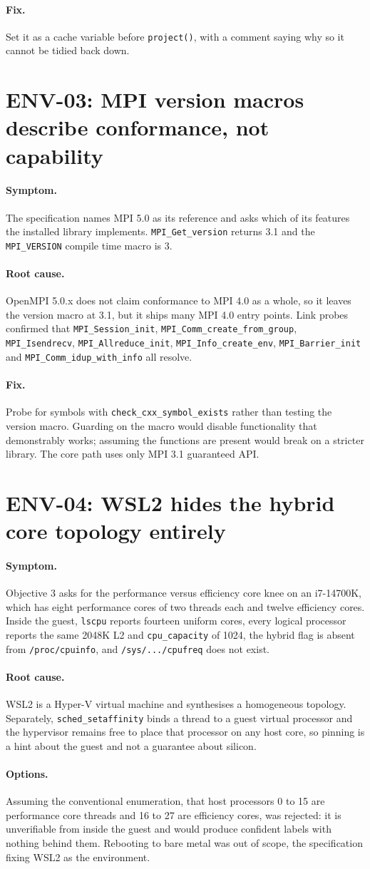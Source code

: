 \documentclass[11pt,a4paper]{report}
\newcommand{\symptom}[1]{\paragraph{Symptom.}#1}
\newcommand{\rootcause}[1]{\paragraph{Root cause.}#1}
\newcommand{\options}[1]{\paragraph{Options.}#1}
\newcommand{\fix}[1]{\paragraph{Fix.}#1}
\begin{document}
\fix{Set it as a cache variable before \texttt{project()}, with a comment saying
why so it cannot be tidied back down.}

\section{ENV-03: MPI version macros describe conformance, not capability}

\symptom{The specification names MPI 5.0 as its reference and asks which of its
features the installed library implements. \texttt{MPI\_Get\_version} returns
3.1 and the \texttt{MPI\_VERSION} compile time macro is 3.}

\rootcause{OpenMPI 5.0.x does not claim conformance to MPI 4.0 as a whole, so it
leaves the version macro at 3.1, but it ships many MPI 4.0 entry points. Link
probes confirmed that \texttt{MPI\_Session\_init},
\texttt{MPI\_Comm\_create\_from\_group}, \texttt{MPI\_Isendrecv},
\texttt{MPI\_Allreduce\_init}, \texttt{MPI\_Info\_create\_env},
\texttt{MPI\_Barrier\_init} and \texttt{MPI\_Comm\_idup\_with\_info} all
resolve.}

\fix{Probe for symbols with \texttt{check\_cxx\_symbol\_exists} rather than
testing the version macro. Guarding on the macro would disable functionality
that demonstrably works; assuming the functions are present would break on a
stricter library. The core path uses only MPI 3.1 guaranteed API.}

\section{ENV-04: WSL2 hides the hybrid core topology entirely}

\symptom{Objective 3 asks for the performance versus efficiency core knee on an
i7-14700K, which has eight performance cores of two threads each and twelve
efficiency cores. Inside the guest, \texttt{lscpu} reports fourteen uniform
cores, every logical processor reports the same 2048K L2 and
\texttt{cpu\_capacity} of 1024, the hybrid flag is absent from
\texttt{/proc/cpuinfo}, and \texttt{/sys/.../cpufreq} does not exist.}

\rootcause{WSL2 is a Hyper-V virtual machine and synthesises a homogeneous
topology. Separately, \texttt{sched\_setaffinity} binds a thread to a guest
virtual processor and the hypervisor remains free to place that processor on any
host core, so pinning is a hint about the guest and not a guarantee about
silicon.}

\options{Assuming the conventional enumeration, that host processors 0 to 15 are
performance core threads and 16 to 27 are efficiency cores, was rejected: it is
unverifiable from inside the guest and would produce confident labels with
nothing behind them. Rebooting to bare metal was out of scope, the specification
fixing WSL2 as the environment.}
\end{document}
